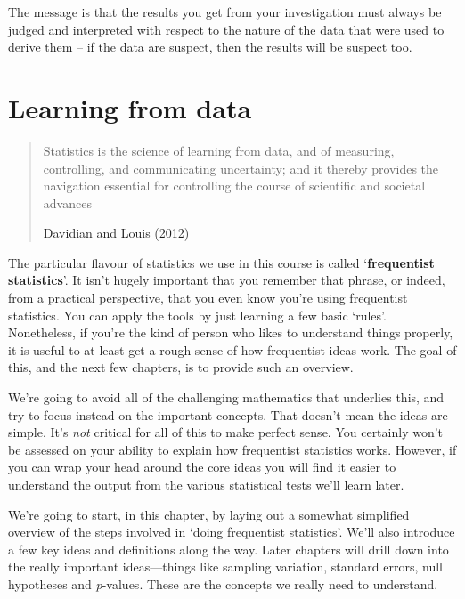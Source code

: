 \documentclass[]{book}
\begin{document}
The message is that the results you get from your investigation must
always be judged and interpreted with respect to the nature of the data
that were used to derive them -- if the data are suspect, then the
results will be suspect too.

\hypertarget{learning-from-data}{\chapter{Learning from
data}\label{learning-from-data}}

\begin{quote}
Statistics is the science of learning from data, and of measuring,
controlling, and communicating uncertainty; and it thereby provides the
navigation essential for controlling the course of scientific and
societal advances

\href{https://doi.org/10.1126/science.1218685}{Davidian and Louis
(2012)}
\end{quote}

The particular flavour of statistics we use in this course is called
`\textbf{frequentist statistics}'. It isn't hugely important that you
remember that phrase, or indeed, from a practical perspective, that you
even know you're using frequentist statistics. You can apply the tools
by just learning a few basic `rules'. Nonetheless, if you're the kind of
person who likes to understand things properly, it is useful to at least
get a rough sense of how frequentist ideas work. The goal of this, and
the next few chapters, is to provide such an overview.

We're going to avoid all of the challenging mathematics that underlies
this, and try to focus instead on the important concepts. That doesn't
mean the ideas are simple. It's \emph{not} critical for all of this to
make perfect sense. You certainly won't be assessed on your ability to
explain how frequentist statistics works. However, if you can wrap your
head around the core ideas you will find it easier to understand the
output from the various statistical tests we'll learn later.

We're going to start, in this chapter, by laying out a somewhat
simplified overview of the steps involved in `doing frequentist
statistics'. We'll also introduce a few key ideas and definitions along
the way. Later chapters will drill down into the really important
ideas---things like sampling variation, standard errors, null hypotheses
and \emph{p}-values. These are the concepts we really need to
understand.
\end{document}

